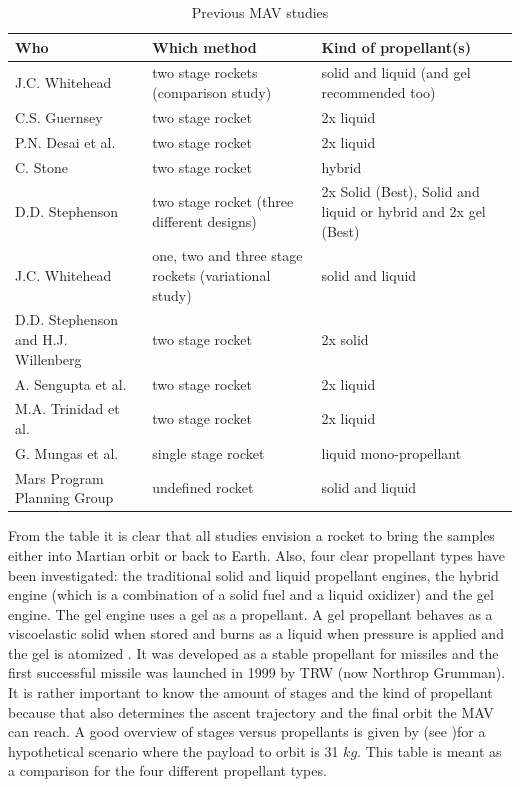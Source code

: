 \begin{table}[!ht]
\begin{center}
\caption{Previous \ac{MAV} studies}
\label{tab:refmavstud}
\begin{tabular}{|p{5cm}|p{5cm}|p{5cm}|}
\hline 
\textbf{Who} 		& \textbf{Which method} & \textbf{Kind of propellant(s)} \\ \hline \hline
J.C. Whitehead \cite{whitehead1997} 		& two stage rockets (comparison study)  & solid and liquid (and gel recommended too)  \\ \hline
C.S. Guernsey \cite{guernsey1998} 		& two stage rocket & 2x liquid  \\ \hline
P.N. Desai et al. \cite{desai1998} 		& two stage rocket & 2x liquid  \\ \hline
C. Stone	\cite{stone1999}	& two stage rocket & hybrid  \\ \hline
D.D. Stephenson \cite{stephenson2002} 		& two stage rocket (three different designs) & 2x Solid (Best), Solid and liquid or hybrid and 2x gel (Best)  \\ \hline
J.C. Whitehead \cite{whitehead2005} 		& one, two and three stage rockets (variational study)  & solid and liquid  \\ \hline
D.D. Stephenson and H.J. Willenberg 		\cite{stephenson2006}& two stage rocket & 2x solid  \\ \hline
A. Sengupta et al. \cite{sengupta2012} 		& two stage rocket & 2x liquid  \\ \hline
M.A. Trinidad et al. \cite{trinidad2012} 		& two stage rocket & 2x liquid  \\ \hline
G. Mungas et al. 	\cite{mungas2012}	& single stage rocket & liquid mono-propellant  \\ \hline
Mars Program Planning Group 	\cite{mppg2012}	& undefined rocket & solid and liquid  \\ \hline
 		
\end{tabular}
\end{center}
\end{table} 

From the table it is clear that all studies envision a rocket to bring the samples either into Martian orbit or back to Earth. Also, four clear propellant types have been investigated: the traditional solid and liquid propellant engines, the hybrid engine (which is a combination of a solid fuel and a liquid oxidizer) and the gel engine. The gel engine uses a gel as a propellant. A gel propellant behaves as a viscoelastic solid when stored and burns as a liquid when pressure is applied and the gel is atomized \cite{natan2002}. It was developed as a stable propellant for missiles and the first successful missile was launched in 1999 by \ac{TRW} (now Northrop  Grumman). It is rather important to know the amount of stages and the kind of propellant because that also determines the ascent trajectory and the final orbit the \ac{MAV} can reach. A good overview of stages versus propellants is given by \cite{trinidad2012} (see )for a hypothetical scenario where the payload to orbit is 31 $kg$. This table is meant as a comparison for the four different propellant types. 


